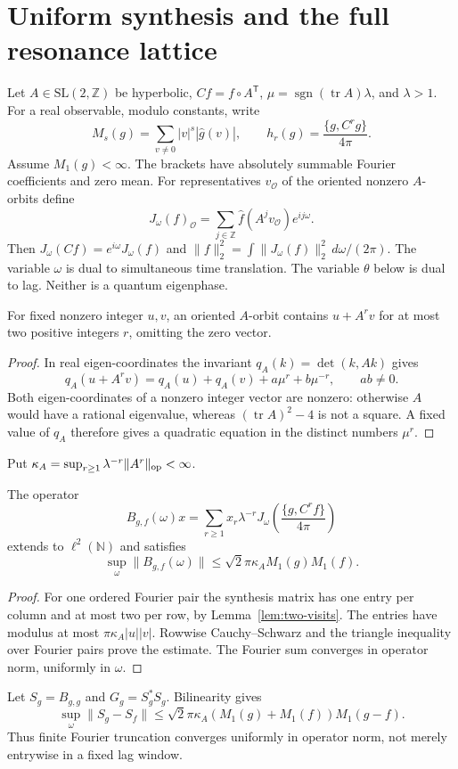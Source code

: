 \section{Uniform synthesis and the full resonance lattice}
\label{sec:wiener-riesz}
Let $A\in\mathrm{SL}(2,\mathbb Z)$ be hyperbolic, $Cf=f\circ A^{\mathsf T}$,
$\mu=\operatorname{sgn}(\operatorname{tr}A)\lambda$, and $\lambda>1$.
For a real observable, modulo constants, write
\[
 M_s(g)=\sum_{v\ne0}|v|^s|\widehat g(v)|,
 \qquad h_r(g)=\frac{\{g,C^rg\}}{4\pi}.
\]
Assume $M_1(g)<\infty$. The brackets have absolutely summable Fourier
coefficients and zero mean. For representatives $v_{\mathcal O}$ of the
oriented nonzero $A$-orbits define
\[
 J_\omega(f)_{\mathcal O}
 =\sum_{j\in\mathbb Z}\widehat f(A^jv_{\mathcal O})e^{ij\omega}.
\]
Then $J_\omega(Cf)=e^{i\omega}J_\omega(f)$ and
$\|f\|_2^2=\int\|J_\omega(f)\|_2^2\,d\omega/(2\pi)$.
The variable $\omega$ is dual to simultaneous time translation. The variable
$\theta$ below is dual to lag. Neither is a quantum eigenphase.

\begin{lemma}\label{lem:two-visits}
For fixed nonzero integer $u,v$, an oriented $A$-orbit contains
$u+A^rv$ for at most two positive integers $r$, omitting the zero vector.
\end{lemma}
\begin{proof}
In real eigen-coordinates the invariant $q_A(k)=\det(k,Ak)$ gives
\[
 q_A(u+A^rv)=q_A(u)+q_A(v)+a\mu^r+b\mu^{-r},\qquad ab\ne0.
\]
Both eigen-coordinates of a nonzero integer vector are nonzero: otherwise
$A$ would have a rational eigenvalue, whereas
$(\operatorname{tr}A)^2-4$ is not a square. A fixed value of $q_A$ therefore
gives a quadratic equation in the distinct numbers $\mu^r$.
\end{proof}

Put $\kappa_A=\sup_{r\ge1}\lambda^{-r}\|A^r\|_{\rm op}<\infty$.
\begin{theorem}\label{thm:wiener-synthesis}
The operator
\[
 B_{g,f}(\omega)x=\sum_{r\ge1}x_r\lambda^{-r}
          J_\omega\!\left(\frac{\{g,C^rf\}}{4\pi}\right)
\]
extends to $\ell^2(\mathbb N)$ and satisfies
\[
 \sup_\omega\|B_{g,f}(\omega)\|
 \le\sqrt2\pi\kappa_A M_1(g)M_1(f).
\]
\end{theorem}
\begin{proof}
For one ordered Fourier pair the synthesis matrix has one entry per column
and at most two per row, by Lemma~\ref{lem:two-visits}. The entries have
modulus at most $\pi\kappa_A|u||v|$. Rowwise Cauchy--Schwarz and the triangle
inequality over Fourier pairs prove the estimate. The Fourier sum converges
in operator norm, uniformly in $\omega$.
\end{proof}
Let $S_g=B_{g,g}$ and $G_g=S_g^*S_g$. Bilinearity gives
\[
 \sup_\omega\|S_g-S_f\|
 \le\sqrt2\pi\kappa_A(M_1(g)+M_1(f))M_1(g-f).
\]
Thus finite Fourier truncation converges uniformly in operator norm, not
merely entrywise in a fixed lag window.

